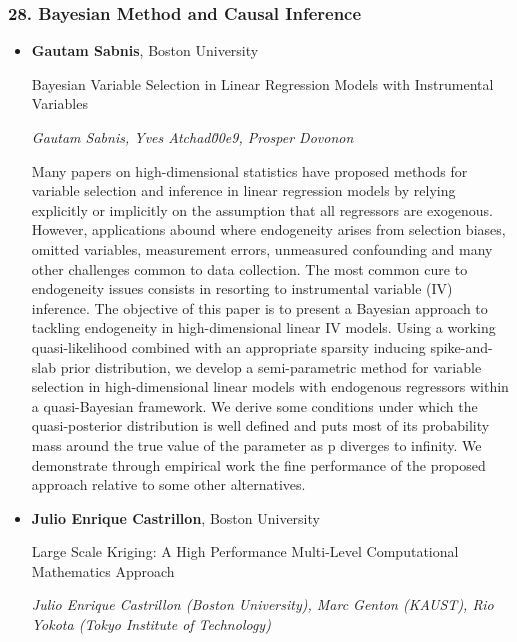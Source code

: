 \subsubsection*{28. Bayesian Method and Causal Inference}

\begin{itemize}
\item \textbf{Gautam Sabnis}, Boston University

Bayesian Variable Selection in Linear Regression Models with Instrumental Variables

\emph{\footnotesize Gautam Sabnis, Yves Atchad\u00e9, Prosper Dovonon}

Many papers on high-dimensional statistics have proposed methods for variable selection and inference in linear regression models by relying explicitly or implicitly on the assumption that all regressors are exogenous. However, applications abound where endogeneity arises from selection biases, omitted variables, measurement errors, unmeasured confounding and many other challenges common to data collection. The most common cure to endogeneity issues consists in resorting to instrumental variable (IV) inference. The objective of this paper is to present a Bayesian approach to tackling endogeneity in high-dimensional linear IV models. Using a working quasi-likelihood combined with an appropriate sparsity inducing spike-and-slab prior distribution, we develop a semi-parametric method for variable selection in high-dimensional linear models with endogenous regressors within a quasi-Bayesian framework. We derive some conditions under which the quasi-posterior distribution is well defined and puts most of its probability mass around the true value of the parameter as p diverges to infinity. We demonstrate through empirical work the fine performance of the proposed approach relative to some other alternatives.

\item \textbf{Julio Enrique Castrillon}, Boston University

Large Scale Kriging: A High Performance Multi-Level Computational Mathematics Approach

\emph{\footnotesize Julio Enrique Castrillon (Boston University),  Marc Genton (KAUST), Rio Yokota (Tokyo Institute of Technology)}


\end{itemize}
